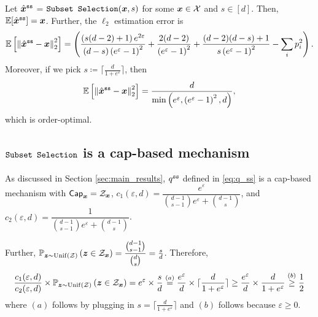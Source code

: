 \begin{proposition}
Let $\hat{{\boldsymbol{x}}}^{\texttt{ss}}$ = \emph{$\texttt{Subset Selection}({\boldsymbol{x}},s)$} for some ${\boldsymbol{x}} \in \mathcal{X}$ and $s \in [d]$. Then, $\mathbb{E}[\hat{{\boldsymbol{x}}}^{\texttt{ss}}] = {\boldsymbol{x}}$. Further, the $\ell_2$ estimation error is 
\begin{equation*}
    \mathbb{E}\left[ \left\lVert \hat{{\boldsymbol{x}}}^{\texttt{ss}} -{\boldsymbol{x}} \right\rVert^2_2\right] = \left( \frac{\left( s(d-2)+1 \right) e^{2\varepsilon}}{(d-s)\left( e^\varepsilon -1\right)^2}+\frac{2(d-2)}{\left( e^\varepsilon -1\right)^2}+ \frac{(d-2)(d-s)+1}{s\left( e^\varepsilon -1\right)^2} - \sum_i p_i^2\right).
\end{equation*}
Moreover, if we pick $s \coloneqq \lceil \frac{d}{1+e^\varepsilon}\rceil$, then
$$\mathbb{E}\left[ \left\lVert \hat{{\boldsymbol{x}}}^{\texttt{ss}} -{\boldsymbol{x}}\right\rVert^2_2\right] = \frac{d}{\min\left( e^\varepsilon, \left( e^\varepsilon-1 \right)^2, d \right)}, $$
which is order-optimal.
\end{proposition}

\subsection{\texorpdfstring{$\texttt{Subset Selection}$}{Subset Selection} is a cap-based mechanism}\label{appendix:ss_cap}
As discussed in Section \ref{sec:main_results}, $q^{\texttt{ss}}$ defined in \eqref{eq:q_ss} is a cap-based mechanism with $\mathsf{Cap}_{{\boldsymbol{x}}} = \mathcal{Z}_{{\boldsymbol{x}}}$, $c_1(\varepsilon, d) = \dfrac{e^{\varepsilon}}{{ \binom{d-1}{s-1} }e^{\varepsilon}+{ \binom{d-1}{s} }}$, and $c_2(\varepsilon, d) = \dfrac{1}{{ \binom{d-1}{s-1} }e^{\varepsilon}+{ \binom{d-1}{s} }}$.

Further, $\mathbb{P}_{{\boldsymbol{z}} \sim \mathrm{Unif}(\mathcal{Z})}\left( {\boldsymbol{z}} \in \mathcal{Z}_{{\boldsymbol{x}}} \right) = \dfrac{ \binom{d-1}{s-1}}{ \binom{d}{s}} = \frac{s}{d}$. Therefore,
\begin{align}
    \frac{c_1(\varepsilon, d)}{c_2(\varepsilon, d)} \times \mathbb{P}_{{\boldsymbol{z}} \sim \mathrm{Unif}(\mathcal{Z})}\left( {\boldsymbol{z}} \in \mathcal{Z}_{{\boldsymbol{x}}} \right) = e^{\varepsilon} \times \frac{s}{d} \stackrel{(a)}{=}
    \frac{e^{\varepsilon}}{d} \times \lceil \frac{d}{1+e^\varepsilon}\rceil \geq \frac{e^{\varepsilon}}{d} \times \frac{d}{1+e^\varepsilon} \stackrel{(b)}{\geq} \frac{1}{2}
\end{align}
where $(a)$ follows by plugging in $s = \lceil \frac{d}{1+e^\varepsilon}\rceil$ and $(b)$ follows because $\varepsilon \geq 0$.